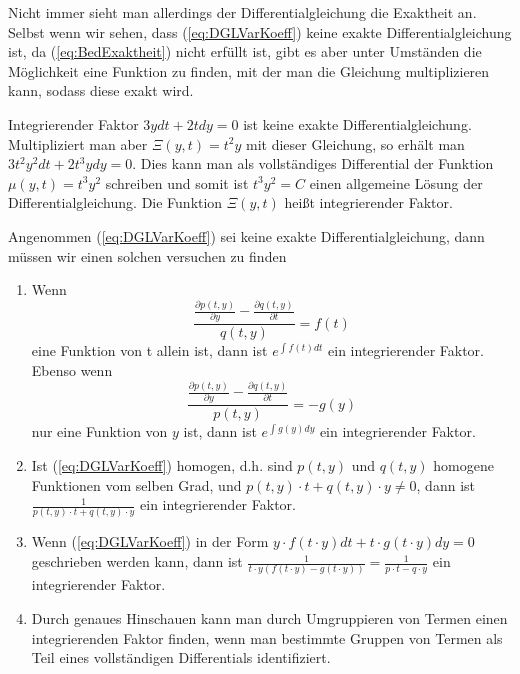 Nicht immer sieht man allerdings der Differentialgleichung die Exaktheit an.
Selbst wenn wir sehen, dass (\ref{eq:DGLVarKoeff}) keine exakte
Differentialgleichung ist, da (\ref{eq:BedExaktheit}) nicht erfüllt ist, gibt
es aber unter Umständen die Möglichkeit eine Funktion zu finden, mit der man
die Gleichung multiplizieren kann, sodass diese exakt wird. 
\begin{note}{Integrierender Faktor}
  $3ydt+2tdy=0$ ist keine exakte Differentialgleichung. Multipliziert man aber
  $\Xi(y,t)=t^2y$ mit dieser Gleichung, so erhält man $3t^2y^2dt+2t^3ydy=0$.
  Dies kann man als vollständiges Differential der Funktion $\mu(y,t)=t^3y^2$
  schreiben und somit ist $t^3y^2=C$ einen allgemeine Lösung der
  Differentialgleichung. Die Funktion $\Xi(y,t)$ hei{\ss}t integrierender Faktor.
\end{note}
Angenommen (\ref{eq:DGLVarKoeff}) sei keine exakte Differentialgleichung, 
dann müssen wir einen solchen versuchen zu finden
\begin{enumerate}
    \item Wenn 
    \[\frac{\frac{\partial p(t,y)}{\partial y}-\frac{\partial q(t,y)}{\partial t}}{q(t,y)}=f(t)\] 
    eine Funktion von t allein ist, dann ist $e^{\int f(t)dt}$ ein integrierender Faktor. 
    Ebenso wenn
    \[\frac{\frac{\partial p(t,y)}{\partial y}-\frac{\partial q(t,y)}{\partial t}}{p(t,y)}=-g(y)\]
    nur eine Funktion von $y$ ist, dann ist $e^{\int g(y)dy}$ ein integrierender Faktor.
    \item Ist (\ref{eq:DGLVarKoeff}) homogen, d.h. sind $p(t,y)$ und $q(t,y)$
      homogene Funktionen vom selben Grad, und $p(t,y)\cdot t+q(t,y)\cdot y\ne
      0$, dann ist $\frac{1}{p(t,y)\cdot t+q(t,y)\cdot y}$ ein integrierender
      Faktor.
    \item Wenn (\ref{eq:DGLVarKoeff}) in der Form $y\cdot f(t\cdot y)dt+t\cdot g(t\cdot y)dy=0$
    geschrieben werden kann, dann ist $\frac{1}{t\cdot y(f(t\cdot y)-g(t\cdot y))}=\frac{1}{p\cdot t-q\cdot y}$ ein integrierender Faktor.
    \item Durch genaues Hinschauen kann man durch Umgruppieren von Termen einen
      integrierenden Faktor finden, wenn man bestimmte Gruppen von Termen als
      Teil eines vollständigen Differentials identifiziert.
\end{enumerate}
